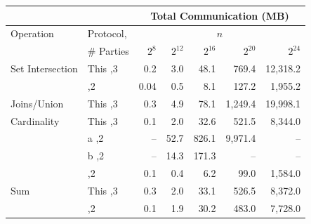\begin{figure*}[t!]\centering\footnotesize
	\begin{tabular}{|l |l|| r | r |r |r|r|}
		\cline{3-7}
		\multicolumn{1}{c}{}              & \multicolumn{1}{c}{}                            & \multicolumn{5}{|c|}{Total Communication (MB)}    \\ \hline
		\multirow{2}{*}{Operation}        & \multirow{1}{*}{Protocol,}                      &             \multicolumn{5}{c|}{$n$}              \\
		                                  & \# Parties                                      & $2^8$ & $2^{12}$ & $2^{16}$ & $2^{20}$ & $2^{24}$ \\ \hline\hline
		\multirow{2}{*}{Set Intersection} & This                         \hfill ,3          & 0.2   & 3.0      & 48.1     & 769.4    & 12,318.2 \\ \cline{2-7}
		                                  & \cite{CCS:KKRT16}                     \hfill ,2 & 0.04  & 0.5      & 8.1      & 127.2    &  1,955.2 \\ \hline\hline
		\multirow{1}{*}{Joins/Union}      & This                        \hfill ,3           & 0.3   & 4.9      & 78.1     & 1,249.4  & 19,998.1 \\ \hline\hline
		\multirow{3}{*}{Cardinality}      & This                          \hfill ,3         & 0.1   & 2.0      & 32.6     & 521.5    &  8,344.0 \\ \cline{2-7}
		                                  & \cite{PSWW18}a                   \hfill ,2      & --    & 52.7     & 826.1    & 9,971.4  &       -- \\ \cline{2-7}
		                                  & \cite{PSWW18}b                   \hfill ,2      & --    & 14.3     & 171.3    & --       &       -- \\ \cline{2-7}
		                                  & \cite{DBLP:conf/cans/CristofaroGT12} \hfill ,2  & 0.1   & 0.4      & 6.2      & 99.0     &  1,584.0 \\ \hline\hline
		\multirow{2}{*}{Sum}              & This                           \hfill ,3        & 0.3   & 2.0      & 33.1     & 526.5    &  8,372.0 \\ \cline{2-7}
		                                  & \cite{cryptoeprint:2017:738}    \hfill ,2       & 0.1   & 1.9      & 30.2     & 483.0    &  7,728.0 \\ \hline\hline

\end{tabular}
\end{figure*}
